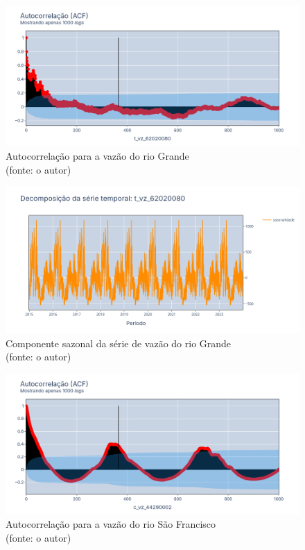 \begin{figure}[!h]
	\centering
	\includegraphics[scale=0.33]{Figuras/rio_grande/acf_rio_grande.png}
	\caption{Autocorrelação para a vazão do rio Grande\\(fonte: o autor)}
	\label{fig:acf_rio_grande}
\end{figure}

\begin{figure}[!h]
	\centering
	\includegraphics[scale=0.33]{Figuras/rio_grande/sazonalidade_rio_grande.png}
	\caption{Componente sazonal da série de vazão do rio Grande\\(fonte: o autor)}
	\label{fig:sazonalidade_rio_grande}
\end{figure}

\begin{figure}[!h]
	\centering
	\includegraphics[scale=0.33]{Figuras/rio_sao_francisco/acf_rio_sao_francisco.png}
	\caption{Autocorrelação para a vazão do rio São Francisco\\(fonte: o autor)}
	\label{fig:acf_rio_sao_francisco}
\end{figure}

